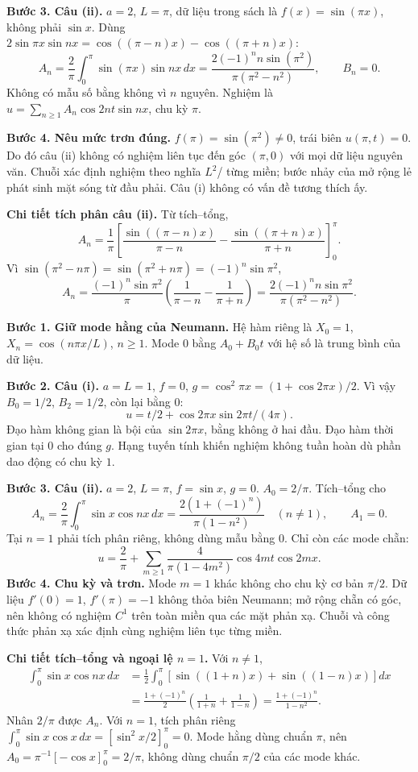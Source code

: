 \textbf{Bước 3. Câu (ii).} $a=2$, $L=\pi$, dữ liệu trong sách là $f(x)=\sin(\pi x)$, không phải $\sin x$. Dùng $2\sin\pi x\sin nx=\cos((\pi-n)x)-\cos((\pi+n)x)$:
\[A_n=\frac2\pi\int_0^\pi\sin(\pi x)\sin nx\,dx
=\frac{2(-1)^nn\sin(\pi^2)}{\pi(\pi^2-n^2)},\qquad B_n=0.\]
Không có mẫu số bằng không vì $n$ nguyên. Nghiệm là $u=\sum_{n\ge1}A_n\cos2nt\sin nx$, chu kỳ $\pi$.

\textbf{Bước 4. Nêu mức trơn đúng.} $f(\pi)=\sin(\pi^2)\ne0$, trái biên $u(\pi,t)=0$. Do đó câu (ii) không có nghiệm liên tục đến góc $(\pi,0)$ với mọi dữ liệu nguyên văn. Chuỗi xác định nghiệm theo nghĩa $L^2$/ từng miền; bước nhảy của mở rộng lẻ phát sinh mặt sóng từ đầu phải. Câu (i) không có vấn đề tương thích ấy.

\textbf{Chi tiết tích phân câu (ii).} Từ tích–tổng,
\[A_n=\frac1\pi\left[\frac{\sin((\pi-n)x)}{\pi-n}-\frac{\sin((\pi+n)x)}{\pi+n}\right]_0^\pi.\]
Vì $\sin(\pi^2-n\pi)=\sin(\pi^2+n\pi)=(-1)^n\sin\pi^2$,
\[A_n=\frac{(-1)^n\sin\pi^2}{\pi}\left(\frac1{\pi-n}-\frac1{\pi+n}\right)
=\frac{2(-1)^nn\sin\pi^2}{\pi(\pi^2-n^2)}.\]

\textbf{Bước 1. Giữ mode hằng của Neumann.} Hệ hàm riêng là $X_0=1$, $X_n=\cos(n\pi x/L)$, $n\ge1$. Mode $0$ bằng $A_0+B_0t$ với hệ số là trung bình của dữ liệu.

\textbf{Bước 2. Câu (i).} $a=L=1$, $f=0$, $g=\cos^2\pi x=(1+\cos2\pi x)/2$. Vì vậy $B_0=1/2$, $B_2=1/2$, còn lại bằng $0$:
\[u=t/2+\cos2\pi x\sin2\pi t/(4\pi).\]
Đạo hàm không gian là bội của $\sin2\pi x$, bằng không ở hai đầu. Đạo hàm thời gian tại $0$ cho đúng $g$. Hạng tuyến tính khiến nghiệm không tuần hoàn dù phần dao động có chu kỳ $1$.

\textbf{Bước 3. Câu (ii).} $a=2$, $L=\pi$, $f=\sin x$, $g=0$. $A_0=2/\pi$. Tích–tổng cho
\[A_n=\frac2\pi\int_0^\pi\sin x\cos nx\,dx
=\frac{2(1+(-1)^n)}{\pi(1-n^2)}\quad(n\ne1),\qquad A_1=0.\]
Tại $n=1$ phải tích phân riêng, không dùng mẫu bằng $0$. Chỉ còn các mode chẵn:
\[u=\frac2\pi+\sum_{m\ge1}\frac4{\pi(1-4m^2)}\cos4mt\cos2mx.\]
\textbf{Bước 4. Chu kỳ và trơn.} Mode $m=1$ khác không cho chu kỳ cơ bản $\pi/2$. Dữ liệu $f'(0)=1$, $f'(\pi)=-1$ không thỏa biên Neumann; mở rộng chẵn có góc, nên không có nghiệm $C^1$ trên toàn miền qua các mặt phản xạ. Chuỗi và công thức phản xạ xác định cùng nghiệm liên tục từng miền.

\textbf{Chi tiết tích–tổng và ngoại lệ $n=1$.} Với $n\ne1$,
\[\begin{aligned}
\int_0^\pi\sin x\cos nx\,dx
&=\frac12\int_0^\pi[\sin((1+n)x)+\sin((1-n)x)]dx\\
&=\frac{1+(-1)^n}{2}\left(\frac1{1+n}+\frac1{1-n}\right)
=\frac{1+(-1)^n}{1-n^2}.
\end{aligned}\]
Nhân $2/\pi$ được $A_n$. Với $n=1$, tích phân riêng $\int_0^\pi\sin x\cos x\,dx=[\sin^2x/2]_0^\pi=0$. Mode hằng dùng chuẩn $\pi$, nên $A_0=\pi^{-1}[-\cos x]_0^\pi=2/\pi$, không dùng chuẩn $\pi/2$ của các mode khác.

